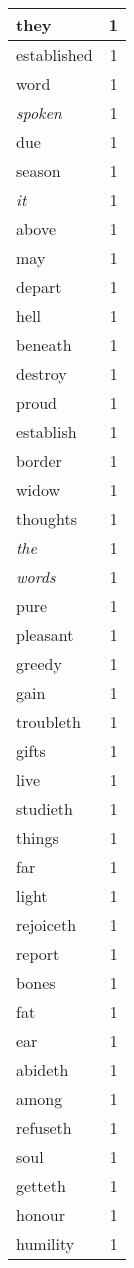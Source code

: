 \begin{center}
\begin{longtable}{l|r}
they & 1\\ \hline 
established & 1\\ \hline 
word & 1\\ \hline 
\emph{spoken} & 1\\ \hline 
due & 1\\ \hline 
season & 1\\ \hline 
\emph{it} & 1\\ \hline 
above & 1\\ \hline 
may & 1\\ \hline 
depart & 1\\ \hline 
hell & 1\\ \hline 
beneath & 1\\ \hline 
destroy & 1\\ \hline 
proud & 1\\ \hline 
establish & 1\\ \hline 
border & 1\\ \hline 
widow & 1\\ \hline 
thoughts & 1\\ \hline 
\emph{the} & 1\\ \hline 
\emph{words} & 1\\ \hline 
pure & 1\\ \hline 
pleasant & 1\\ \hline 
greedy & 1\\ \hline 
gain & 1\\ \hline 
troubleth & 1\\ \hline 
gifts & 1\\ \hline 
live & 1\\ \hline 
studieth & 1\\ \hline 
things & 1\\ \hline 
far & 1\\ \hline 
light & 1\\ \hline 
rejoiceth & 1\\ \hline 
report & 1\\ \hline 
bones & 1\\ \hline 
fat & 1\\ \hline 
ear & 1\\ \hline 
abideth & 1\\ \hline 
among & 1\\ \hline 
refuseth & 1\\ \hline 
soul & 1\\ \hline 
getteth & 1\\ \hline 
honour & 1\\ \hline 
humility & 1\\ \hline 
\end{longtable}  
\end{center}  



